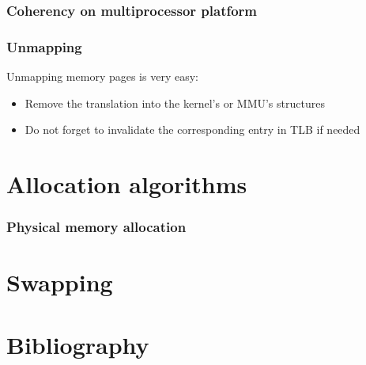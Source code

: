 
\begin{frame}
  \frametitle{Coherency on multiprocessor platform}

  \begin{center}
  \end{center}

\end{frame}


\begin{frame}
  \frametitle{Unmapping}

  Unmapping memory pages is very easy:

  \begin{itemize}
  \item
    Remove the translation into the kernel's or MMU's structures
  \item
    Do not forget to invalidate the corresponding entry in TLB if
    needed
  \end{itemize}

\end{frame}

%
%

\section{Allocation algorithms}


\begin{frame}
  \frametitle{Physical memory allocation}

\end{frame}


%
%

\section{Swapping}

%
%

\section{Bibliography}

\begin{thebibliography}{4}


\end{thebibliography}


